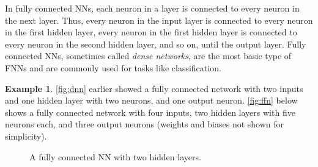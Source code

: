 \documentclass[oneside,11pt,dvipsnames]{book}
\numberwithin{equation}{section}
\theoremstyle{definition}
\newtheorem{example}{Example}[section]
\theoremstyle{remark}
\begin{document}
In fully connected NNs, each neuron in a layer is connected to every neuron in the next layer. Thus, every neuron in the input layer is connected to every neuron in the first hidden layer, every neuron in the first hidden layer is connected to every neuron in the second hidden layer, and so on, until the output layer. Fully connected NNs, sometimes called \emph{dense networks}, are the most basic type of FNNs and are commonly used for tasks like classification. 

\begin{example}
\autoref{fig:dnn} earlier showed a fully connected network with two inputs and one hidden layer with two neurons, and one output neuron. \autoref{fig:ffn} below shows a fully connected network with four inputs, two hidden layers with five neurons each, and three output neurons (weights and biases not shown for simplicity).

\begin{figure}[htp]
    \centering
    \caption{A fully connected NN with two hidden layers.}
    \label{fig:ffn}
\end{figure}
\end{example}
\end{document}

